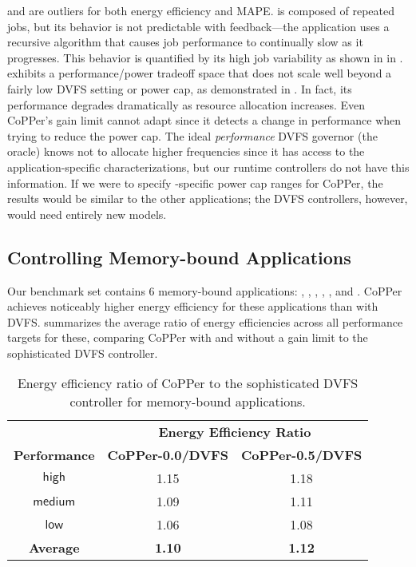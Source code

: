  and  are outliers for both energy efficiency and MAPE.
 is composed of repeated jobs, but its behavior is not predictable with feedback---the application uses a recursive algorithm that causes job performance to continually slow as it progresses.
This behavior is quantified by its high job variability as shown in  in .
 exhibits a performance/power tradeoff space that does not scale well beyond a fairly low DVFS setting or power cap, as demonstrated in .
In fact, its performance degrades dramatically as resource allocation increases.
Even CoPPer's gain limit cannot adapt since it detects a change in performance when trying to reduce the power cap.
The ideal \emph{performance} DVFS governor (the oracle) knows not to allocate higher frequencies since it has access to the application-specific characterizations, but our runtime controllers do not have this information.
If we were to specify -specific power cap ranges for CoPPer, the results would be similar to the other applications; the DVFS controllers, however, would need entirely new models.


\subsection{Controlling Memory-bound Applications}

Our benchmark set contains 6 memory-bound applications: , , , , , and .
CoPPer achieves noticeably higher energy efficiency for these applications than with DVFS.
 summarizes the average ratio of energy efficiencies across all performance targets for these, comparing CoPPer with and without a gain limit to the sophisticated DVFS controller.

\begin{table}[t]
\small
\centering
\caption{Energy efficiency ratio of CoPPer to the sophisticated DVFS controller for memory-bound applications.}
\begin{tabular}{ccc}
  &\multicolumn{2}{c}{\bf Energy Efficiency Ratio} \\
  \textbf{Performance} & \textbf{CoPPer-0.0/DVFS} & {\bf CoPPer-0.5/DVFS} \\
  \hline
  \hline
    $\mathsf{high}$  & 1.15  & 1.18 \\
   $\mathsf{medium}$   & 1.09  & 1.11 \\
   $\mathsf{low}$   & 1.06  & 1.08 \\
  \textbf{Average}& \textbf{1.10}  & \textbf{1.12} \\
  \hline
  \hline
\end{tabular}
\label{tbl:copper-mem}
\end{table}

